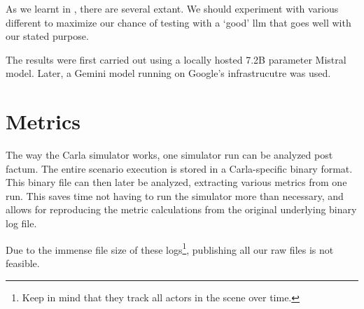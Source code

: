 As we learnt in , there are several  extant. We should
experiment with various different  to maximize our chance of testing with a `good'
\acrshort{llm} that goes well with our stated purpose.

The results were first carried out using a locally hosted \num{7.2}B parameter
Mistral model. Later, a Gemini model running on Google's infrastrucutre was used.

\section{Metrics}

The way the Carla simulator works, one simulator run can be analyzed post factum. The entire
scenario execution is stored in a Carla-specific binary format. This binary file can then later be
analyzed, extracting various metrics from one run. This saves time not having to run the simulator
more than necessary, and allows for reproducing the metric calculations from the original underlying
binary log file.

Due to the immense file size of these logs\footnote{Keep in mind that they track all actors in the
    scene over time.}, publishing all our raw files is not feasible.
